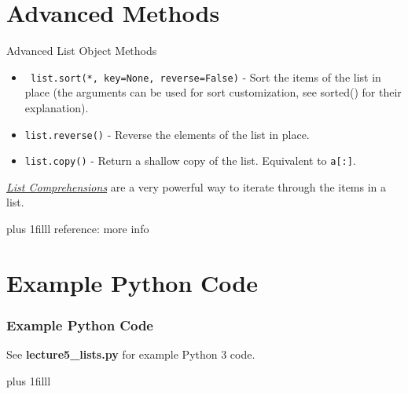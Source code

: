 \documentclass[fleqn]{beamer} %
\newcommand{\sectiontitleIV}{Advanced Methods}
\newcommand{\sectiontitleV}{Example Python Code}
\newcommand{\btVFill}{\vskip0pt plus 1filll}
\begin{document}
\section{\sectiontitleIV}	
	\begin{frame}[label=sectionIV] \small
		 
		\vspace*{3mm} 	

		Advanced List Object Methods
		\begin{itemize}

		\item \lstinline{ list.sort(*, key=None, reverse=False)} - Sort the items of the list in place (the arguments can be used for sort customization, see sorted() for their explanation). \\ 
		\item \lstinline{list.reverse()} - Reverse the elements of the list in place. \\ 
		\item \lstinline{list.copy()} - Return a shallow copy of the list. Equivalent to \lstinline{a[:]}. \\ 
		
		\end{itemize}

		\vspace*{10mm}

		\href{https://docs.python.org/3/tutorial/datastructures.html\#list-comprehensions}{\it List Comprehensions} are a very powerful way to iterate through the items in a list.

		\btVFill
		\tiny{reference: more info } 
	\end{frame}

\section{\sectiontitleV}	
 	\begin{frame}[label=sectionV,containsverbatim] \small
 	 	\frametitle{\sectiontitleV}    
 	 	
 	 	\vspace*{15mm}
		See {\bf lecture5\_lists.py} for example Python 3 code.	

 	 	\btVFill
 		\tiny{}
 	\end{frame}
\end{document}
